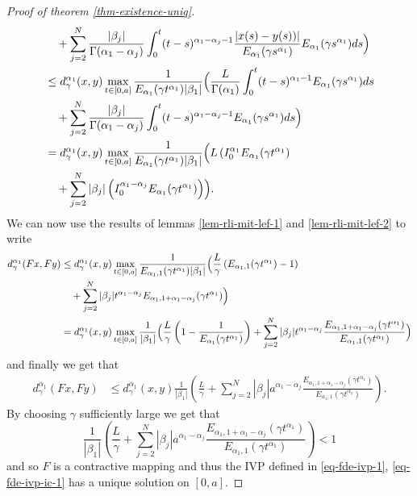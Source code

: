 \begin{proof}[Proof of theorem \ref{thm-existence-uniq}]
\begin{align}
			& \ \ \ + \sum_{j=2}^N \frac{|\beta_j|}{\Gamma(\alpha_1 - \alpha_j)} \int_0^t (t-s)^{\alpha_1 - \alpha_j - 1}\frac{|x(s) - y(s))|}{E_{\alpha_1}(\gamma s^{\alpha_1})}E_{\alpha_1}(\gamma s^{\alpha_1}) ds \Bigr) \\
			&\leq d_\gamma^{\alpha_1}(x,y) \max_{t \in [0, a]} \frac{1}{E_{\alpha_1}(\gamma t^{\alpha_1})|\beta_1|} \Bigl(
			\frac{L}{\Gamma(\alpha_1)}\int_0^t (t-s)^{\alpha_1 - 1} E_{\alpha_1}(\gamma s^{\alpha_1}) ds \\
			& \ \ \ + \sum_{j=2}^N \frac{|\beta_j|}{\Gamma(\alpha_1 - \alpha_j)} \int_0^t (t-s)^{\alpha_1 - \alpha_j - 1}E_{\alpha_1}(\gamma s^{\alpha_1}) ds \Bigr) \\
			&= d_\gamma^{\alpha_1}(x,y) \max_{t \in [0, a]} \frac{1}{E_{\alpha_1}(\gamma t^{\alpha_1})|\beta_1|} \Bigl(
			L \left( I_{0}^{\alpha_1} E_{\alpha_1}(\gamma t^{\alpha_1} \right) \\
			& \ \ \ + \sum_{j=2}^N |\beta_j| \left( I_{0}^{\alpha_1 - \alpha_j} E_{\alpha_1}(\gamma t^{\alpha_1}) \right) \Bigr). \\
	\end{align}
	We can now use the results of lemmas \ref{lem-rli-mit-lef-1} and \ref{lem-rli-mit-lef-2} to write
	\begin{align}
		d_\gamma^{\alpha_1}(Fx,Fy) &\leq d_\gamma^{\alpha_1}(x,y) \max_{t \in [0, a]} \frac{1}{E_{\alpha_1, 1}(\gamma t^{\alpha_1})|\beta_1|} \Bigl(
			\frac{L}{\gamma}\left( E_{\alpha_1,1}(\gamma t^{\alpha_1}) - 1 \right) \\
			& \ \ \ + \sum_{j=2}^N |\beta_j| t^{\alpha_1 - \alpha_j} E_{\alpha_1, 1 + \alpha_1 - \alpha_j}(\gamma t^{\alpha_1}) \Bigr) \\
			&= d_\gamma^{\alpha_1}(x,y) \max_{t \in [0, a]} \frac{1}{|\beta_1|} \Bigl(
			\frac{L}{\gamma}\left( 1- \frac{1}{E_{\alpha_1}(\gamma t^{\alpha_1})} \right) + \sum_{j=2}^N |\beta_j| t^{\alpha_1 - \alpha_j}\frac{E_{\alpha_1,1+\alpha_1-\alpha_j}(\gamma t^{\alpha_1})}{E_{\alpha_1,1}(\gamma t^{\alpha_1})}\Bigr) \\
	\end{align}
	and finally we get that 
	\begin{align}
		d_\gamma^{\alpha_1}(Fx,Fy) &\leq d_\gamma^{\alpha_1}(x,y) \frac{1}{|\beta_1|}\left( \frac{L}{\gamma} + \sum_{j=2}^N |\beta_j| a^{\alpha_1 - \alpha_j} \frac{E_{\alpha_1,1+\alpha_1-\alpha_j}(\gamma t^{\alpha_1})}{E_{\alpha_1,1}(\gamma t^{\alpha_1})} \right).
	\end{align}
	By choosing $ \gamma $ sufficiently large we get that 
	$$
		\frac{1}{|\beta_1|}\left( \frac{L}{\gamma} + \sum_{j=2}^N |\beta_j| a^{\alpha_1 - \alpha_j} \frac{E_{\alpha_1,1+\alpha_1-\alpha_j}(\gamma t^{\alpha_1})}{E_{\alpha_1,1}(\gamma t^{\alpha_1})} \right) < 1
	$$
	and so $ F $ is a contractive mapping and thus the IVP defined in \eqref{eq-fde-ivp-1}, \eqref{eq-fde-ivp-ic-1} has a unique solution on $ [0, a] $.
\end{proof}

